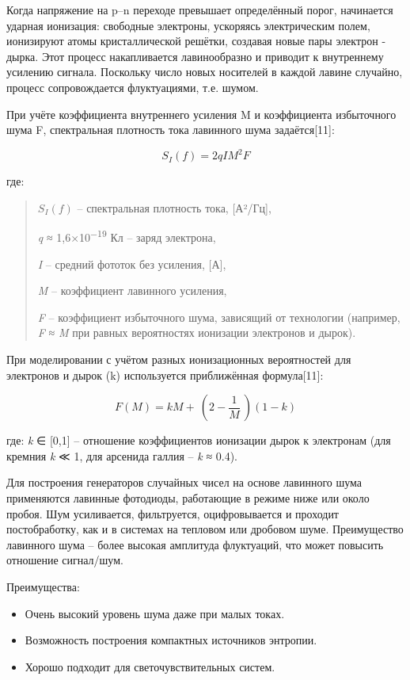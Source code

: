 Когда напряжение на p--n переходе превышает определённый порог,
начинается ударная ионизация: свободные электроны, ускоряясь
электрическим полем, ионизируют атомы кристаллической решётки, создавая
новые пары электрон - дырка. Этот процесс накапливается лавинообразно и
приводит к внутреннему усилению сигнала. Поскольку число новых носителей
в каждой лавине случайно, процесс сопровождается флуктуациями, т.е.
шумом.

При учёте коэффициента внутреннего усиления M и коэффициента избыточного
шума F, спектральная плотность тока лавинного шума задаётся{[}11{]}:

\[S_{I}(f) = 2qIM^{2}F\]

где:

\begin{quote}
\(S_{I}(f)\) -- спектральная плотность тока, {[}А²/Гц{]},

\emph{q} ≈ 1,6×10\textsuperscript{−19} Кл -- заряд электрона,

\emph{I} -- средний фототок без усиления, {[}А{]},

\emph{M} -- коэффициент лавинного усиления,

\emph{F} -- коэффициент избыточного шума, зависящий от технологии
(например, \emph{F} ≈ \emph{M} при равных вероятностях ионизации
электронов и дырок).
\end{quote}

При моделировании с учётом разных ионизационных вероятностей для
электронов и дырок (k) используется приближённая формула{[}11{]}:

\[F(M) = kM + \left. \ \left( 2 - \frac{1}{M} \right.\  \right)(1 - k)\]

где: \emph{k} ∈ {[}0,1{]} -- отношение коэффициентов ионизации дырок к
электронам (для кремния \emph{k} ≪ 1, для арсенида галлия -- \emph{k} ≈
0.4).

Для построения генераторов случайных чисел на основе лавинного шума
применяются лавинные фотодиоды, работающие в режиме ниже или около
пробоя. Шум усиливается, фильтруется, оцифровывается и проходит
постобработку, как и в системах на тепловом или дробовом шуме.
Преимущество лавинного шума -- более высокая амплитуда флуктуаций, что
может повысить отношение сигнал/шум.

Преимущества:

\begin{itemize}
\item
  Очень высокий уровень шума даже при малых токах.
\item
  Возможность построения компактных источников энтропии.
\item
  Хорошо подходит для светочувствительных систем.
\end{itemize}

